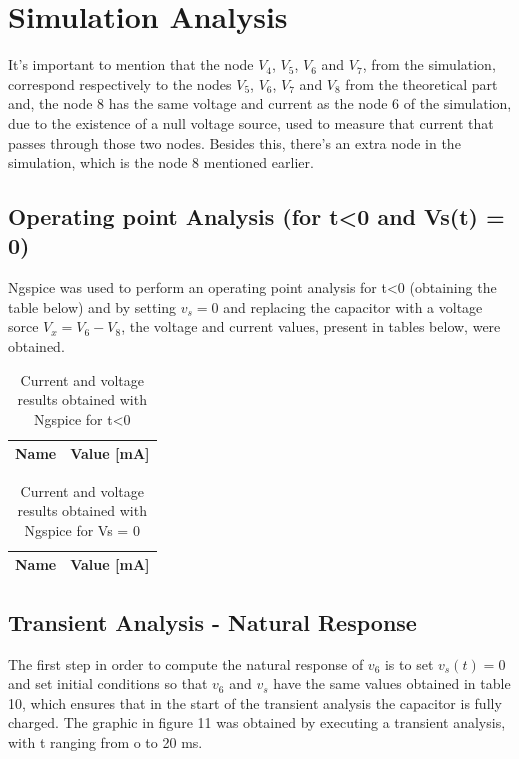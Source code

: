 \section{Simulation Analysis}
\label{sec:simulation}
It’s important to mention that the node $V_4$, $V_5$, $V_6$ and $V_7$, from the simulation, correspond respectively to the nodes $V_5$, $V_6$, $V_7$ and $V_8$ from the theoretical part and, the node 8 has the same voltage and current as the node 6 of the simulation, due to the existence of a null voltage source, used to measure that current that passes through those two nodes. Besides this, there’s an extra node in the simulation, which is the node 8 mentioned earlier.

\subsection{Operating point Analysis (for t<0 and Vs(t) = 0)}

Ngspice was used to perform an operating point analysis for t<0 (obtaining the table below) and by setting $v_s = 0$ and replacing the capacitor with a voltage sorce $V_x = V_6 - V_8$, the voltage and current values, present in tables below, were obtained.

\begin{table}[h!]
	\centering
	\begin{tabular}{|l|r|}
		\hline    
		{\bf Name} & {\bf Value [mA]} \\ \hline
		
	\end{tabular}
	\caption{Current and voltage results obtained with Ngspice for t<0 }
	\label{tab:op}
\end{table}



\begin{table}[h!]
	\centering
	\begin{tabular}{|l|r|}
		\hline    
		{\bf Name} & {\bf Value [mA]} \\ \hline
		
	\end{tabular}
	\caption{Current and voltage results obtained with Ngspice for Vs = 0}
	\label{tab:op}
\end{table}


\subsection{Transient Analysis - Natural Response}

The first step in order to compute the natural response of $v_6$ is to set $v_s(t) = 0$ and set initial conditions so that $v_6$ and $v_s$ have the same values obtained in table 10, which ensures that in the start of the transient analysis the capacitor is fully charged. The graphic in figure 11 was obtained by executing a transient analysis, with t ranging from o to 20 ms.


